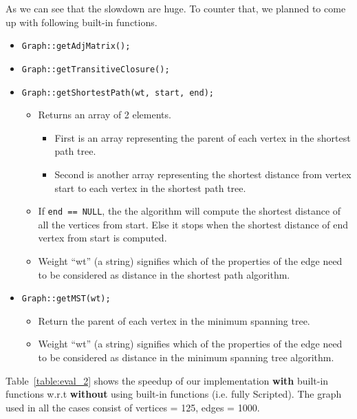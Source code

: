 As we can see that the slowdown are huge. To counter that, we planned to come up 
with following built-in functions.
  \begin{itemize}
    \item { \tt Graph::getAdjMatrix();}
    \item {\tt Graph::getTransitiveClosure();}
    \item {\tt Graph::getShortestPath(wt, start, end);}
    \begin{itemize}
      \item Returns an array of 2 elements. 
      \begin{itemize}
        \item First is an array representing the parent of each vertex in the 
        shortest path tree. 
        \item Second is another array representing the shortest distance from 
        vertex start to each vertex in the shortest path tree.
      \end{itemize}
      \item If {\tt end == NULL}, the the algorithm will compute the shortest
distance of all the vertices from start. Else it stops when the
shortest distance of end vertex from start is computed.
      \item Weight ``wt'' (a string) signifies which of the properties of the
edge need to be considered as distance in the shortest path algorithm.
    \end{itemize} 
    \item {\tt Graph::getMST(wt);}
    \begin{itemize}
      \item Return the parent of each vertex in the minimum spanning tree.
      \item Weight ``wt'' (a string) signifies which of the properties of the
edge need to be considered as distance in the minimum spanning tree algorithm.
    \end{itemize} 
  \end{itemize}


  Table~\ref{table:eval_2} shows the speedup of our implementation \textbf{with} built-in 
  functions w.r.t  \textbf{without} using built-in functions (i.e. fully 
      Scripted). The graph used in 
  all the cases consist of vertices = 125, edges = 1000.

